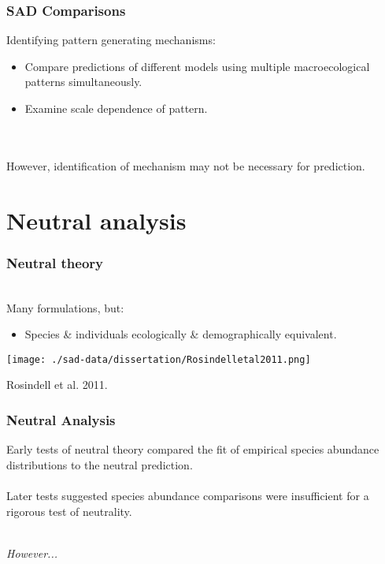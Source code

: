 \documentclass[14pt]{beamer}
\begin{document}
\begin{frame}[t]
\frametitle{SAD Comparisons}
Identifying pattern generating mechanisms:
\begin{itemize}
\item Compare predictions of different models using multiple macroecological patterns simultaneously.\\
\item Examine scale dependence of pattern.
\end{itemize}
~\\
~\\
However, identification of mechanism may not be necessary for prediction.
\end{frame}

\section{Neutral analysis}
\begin{frame}[t]
\frametitle{Neutral theory}
~\\
Many formulations, but:
~\\
\begin{itemize}
\item Species \& individuals ecologically \& demographically equivalent.\\
\end{itemize}
\texttt{[image: ./sad-data/dissertation/Rosindelletal2011.png]}\\
\begin{tiny}
Rosindell et al. 2011.
\end{tiny}
\end{frame}

\begin{frame}
\frametitle{Neutral Analysis}
Early tests of neutral theory compared the fit of empirical species abundance distributions to the neutral prediction.\\
~\\
Later tests suggested species abundance comparisons were insufficient for a rigorous test of neutrality.\\
~\\
\begin{Large}
\emph{However...}
\end{Large}
\end{frame}
\end{document}

